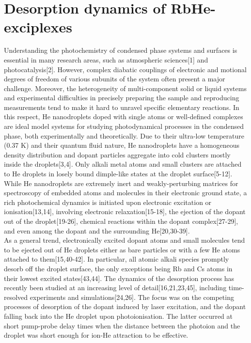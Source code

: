 	\section{Desorption dynamics of RbHe-exciplexes}
		Understanding the photochemistry of condensed phase systems and surfaces is essential in many research areas, such as atmospheric sciences[1] and photocatalysis[2]. However, complex diabatic couplings of electronic and motional degrees of freedom of various subunits of the system often present a major challenge. Moreover, the heterogeneity of multi-component solid or liquid systems and experimental difficulties in precisely preparing the sample and reproducing measurements tend to make it hard to unravel specific elementary reactions. In this respect, He nanodroplets doped with single atoms or well-defined complexes are ideal model systems for studying photodynamical processes in the condensed phase, both experimentally and theoretically. Due to their ultra-low temperature (0.37 K) and their quantum fluid nature, He nanodroplets have a homogeneous density distribution and dopant particles aggregate into cold clusters mostly inside the droplets[3,4]. Only alkali metal atoms and small clusters are attached to He droplets in losely bound dimple-like states at the droplet surface[5-12].\\

		While He nanodroplets are extremely inert and weakly-perturbing matrices for spectroscopy of embedded atoms and molecules in their electronic ground state, a rich photochemical dynamics is initiated upon electronic excitation or ionisation[13,14], involving electronic relaxation[15-18], the ejection of the dopant out of the droplet[19-26], chemical reactions within the dopant complex[27-29], and even among the dopant and the surrounding He[20,30-39].\\

		As a general trend, electronically excited dopant atoms and small molecules tend to be ejected out of He droplets either as bare particles or with a few He atoms attached to them[15,40-42]. In particular, all atomic alkali species promptly desorb off the droplet surface, the only exceptions being Rb and Cs atoms in their lowest excited states[43,44]. The dynamics of the desorption process has recently been studied at an increasing level of detail[16,21,23,45], including time-resolved experiments and simulations[24,26]. The focus was on the competing processes of desorption of the dopant induced by laser excitation, and the dopant falling back into the He droplet upon photoionisation. The latter occurred at short pump-probe delay times when the distance between the photoion and the droplet was short enough for ion-He attraction to be effective.\\

